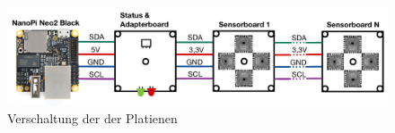 \begin{figure}[H]
\centering
\includegraphics[width=1\textwidth]{img/System-Topologie.png}
\caption{Verschaltung der der Platienen}
\label{fig:Seitenasicht-AS726X}
\end{figure}